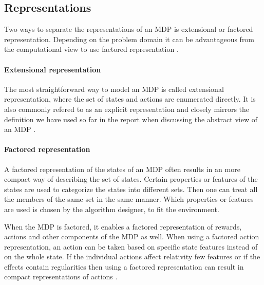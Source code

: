 \subsection{Representations}
Two ways to separate the representations of an MDP is extensional or factored representation. Depending on the problem domain it can be advantageous from the computational view to use factored representation \parencite{dean1999descision}.

\paragraph{Extensional representation}
The most straightforward way to model an MDP is called extensional representation, where the set of states and actions are enumerated directly. It is also commonly refered to as an explicit representation and closely mirrors the definition we have used so far in the report when discussing the abstract view of an MDP \parencite{dean1999descision}.

\paragraph{Factored representation} 
A factored representation of the states of an MDP often results in an more compact way of describing the set of states. Certain properties or features of the states are used to categorize the states into different sets. Then one can treat all the members of the same set in the same manner. Which properties or features are used is chosen by the algorithm designer, to fit the environment.

When the MDP is factored, it enables a factored representation of rewards, actions and other components of the MDP as well. When using a factored action representation, an action can be taken based on specific state features instead of on the whole state. If the individual actions affect relativity few features or if the effects contain regularities then using a factored representation can result in compact representations of actions \parencite{dean1999descision}. 
